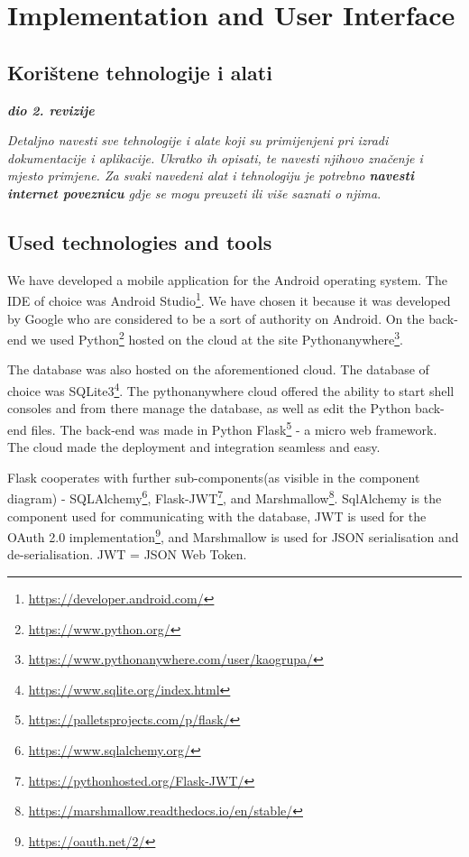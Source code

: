 \chapter{Implementation and User Interface}
		
		
		\section{Korištene tehnologije i alati}
		
			\textbf{\textit{dio 2. revizije}}
			
			 \textit{Detaljno navesti sve tehnologije i alate koji su primijenjeni pri izradi dokumentacije i aplikacije. Ukratko ih opisati, te navesti njihovo značenje i mjesto primjene. Za svaki navedeni alat i tehnologiju je potrebno \textbf{navesti internet poveznicu} gdje se mogu preuzeti ili više saznati o njima}.
			
			
			\eject 
		
		\section{Used technologies and tools}
		
		We have developed a mobile application for the Android operating system. The IDE of choice was Android Studio\footnote{\url{https://developer.android.com/}}. We have chosen it because it was developed by Google who are considered to be a sort of authority on Android. On the back-end we used Python\footnote{\url{https://www.python.org/}} hosted on the cloud at the site Pythonanywhere\footnote{\url{https://www.pythonanywhere.com/user/kaogrupa/}}.
		
		The database was also hosted on the aforementioned cloud. The database of choice was SQLite3\footnote{\url{https://www.sqlite.org/index.html}}. The pythonanywhere cloud offered the ability to start shell consoles and from there manage the database, as well as edit the Python back-end files. The back-end was made in Python Flask\footnote{\url{https://palletsprojects.com/p/flask/}} - a micro web framework. The cloud made the deployment and integration seamless and easy.
		
		Flask cooperates with further sub-components(as visible in the component diagram) - SQLAlchemy\footnote{\url{https://www.sqlalchemy.org/}}, Flask-JWT\footnote{\url{https://pythonhosted.org/Flask-JWT/}}, and Marshmallow\footnote{\url{https://marshmallow.readthedocs.io/en/stable/}}. SqlAlchemy is the component used for communicating with the database, JWT is used for the OAuth 2.0 implementation\footnote{\url{https://oauth.net/2/}}, and Marshmallow is used for JSON serialisation and de-serialisation. JWT = JSON Web Token.
		

